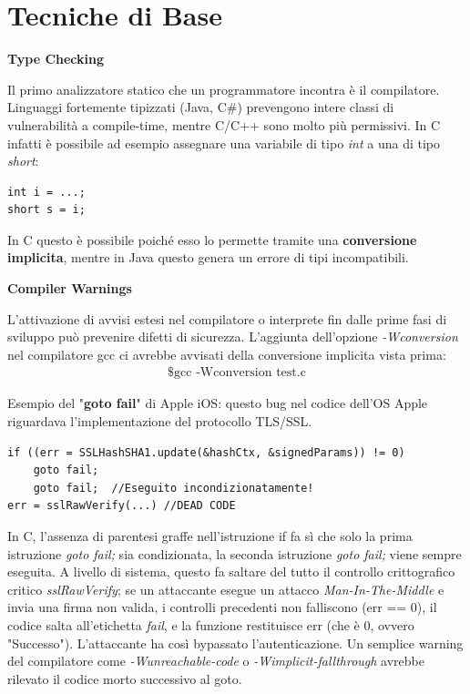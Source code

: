 \section{Tecniche di Base}

\textbf{Type Checking}

Il primo analizzatore statico che un programmatore incontra è il compilatore. 
Linguaggi fortemente tipizzati (Java, C\#) prevengono intere classi di vulnerabilità 
a compile-time, mentre C/C++ sono molto più permissivi. In C infatti è possibile 
ad esempio assegnare una variabile di tipo \textit{int} a una di tipo \textit{short}:

\begin{lstlisting}
int i = ...;
short s = i;
\end{lstlisting}

In C questo è possibile poiché esso lo permette tramite una \textbf{conversione implicita}, mentre 
in Java questo genera un errore di tipi incompatibili.

\textbf{Compiler Warnings}

L'attivazione di avvisi estesi nel compilatore o interprete fin dalle prime fasi di 
sviluppo può prevenire difetti di sicurezza. L'aggiunta dell'opzione \textit{-Wconversion}
nel compilatore gcc ci avrebbe avvisati della conversione implicita vista prima:
\begin{gather*}
    \text{\$ gcc -Wconversion test.c}
\end{gather*}

Esempio del "\textbf{goto fail}" di Apple iOS: questo bug nel codice dell'OS Apple 
riguardava l'implementazione del protocollo TLS/SSL.

\begin{lstlisting}
if ((err = SSLHashSHA1.update(&hashCtx, &signedParams)) != 0)
    goto fail;
    goto fail;  //Eseguito incondizionatamente!
err = sslRawVerify(...) //DEAD CODE
\end{lstlisting}

In C, l'assenza di parentesi graffe nell'istruzione if fa sì che solo la prima 
istruzione \textit{goto fail;} sia condizionata, la seconda istruzione \textit{goto fail;} 
viene sempre eseguita. A livello di sistema, questo fa saltare del tutto il controllo 
crittografico critico \textit{sslRawVerify}; se un attaccante esegue un attacco 
\textit{Man-In-The-Middle} e invia una firma non valida, i controlli precedenti non falliscono 
(err == 0), il codice salta all'etichetta \textit{fail}, e la funzione restituisce 
err (che è 0, ovvero "Successo"). L'attaccante ha così bypassato l'autenticazione.
Un semplice warning del compilatore come \textit{-Wunreachable-code} o \textit{-Wimplicit-fallthrough} 
avrebbe rilevato il codice morto successivo al goto.

